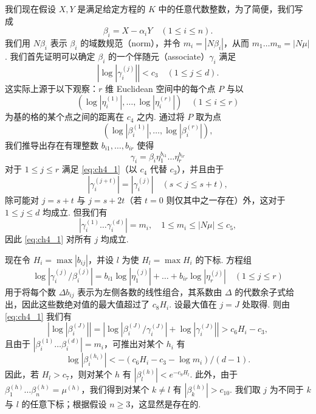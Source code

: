 我们现在假设 $X, Y$ 是满足给定方程的 $K$ 中的任意代数整数，为了简便，我们写成
\[
\beta_i = X - \alpha_i Y \quad (1 \le i \le n).
\]
我们用 $N\beta_i$ 表示 $\beta_i$ 的域数规范（norm），并令 $m_i = |N\beta_i|$，从而 $m_1\dots m_n = |N\mu|$. 我们首先证明可以确定 $\beta_i$ 的一个伴随元（associate）$\gamma_i$ 满足
\begin{equation} \label{eq:ch4_1}\tag{1}
\left|\log\left|\gamma_i^{(j)}\right|\right| < c_3 \quad (1 \le j \le d).
\end{equation}
这实际上源于以下观察：$r$ 维 Euclidean 空间中的每个点 $P$ 与以
\[
(\log |\eta_i^{(1)}|, \dots, \log |\eta_i^{(r)}|) \quad (1 \le i \le r)
\]
为基的格的某个点之间的距离在 $c_4$ 之内. 通过将 $P$ 取为点
\[
(\log |\beta_i^{(1)}|, \dots, \log |\beta_i^{(r)}|),
\]
我们推导出存在有理整数 $b_{i1}, \dots, b_{ir}$ 使得
\begin{equation} \label{eq:ch4_2}\tag{2}
\gamma_i = \beta_i \eta_1^{b_{i1}} \dots \eta_r^{b_{ir}}
\end{equation}
对于 $1 \le j \le r$ 满足 \eqref{eq:ch4_1}（以 $c_4$ 代替 $c_3$），并且由于
\[
\left|\gamma_i^{(j+t)}\right| = \left|\gamma_i^{(j)}\right| \quad (s < j \le s+t),
\]
除可能对 $j = s + t$ 与 $j = s + 2t$（若 $t = 0$ 则仅其中之一存在）外，这对于 $1 \le j \le d$ 均成立. 但我们有
\[
\left|\gamma_i^{(1)}\dots\gamma_i^{(d)}\right| = m_i, \quad 1 \le m_i \le \left|N\mu\right| \le c_5,
\]
因此 \eqref{eq:ch4_1} 对所有 $j$ 均成立.

现在令 $H_i = \max |b_{ij}|$，并设 $l$ 为使 $H_l = \max H_i$ 的下标. 方程组
\[
\log \left|\gamma_i^{(j)}/\beta_i^{(j)}\right| = b_{i1} \log \left|\eta_1^{(j)}\right| + \dots + b_{ir} \log \left|\eta_r^{(j)}\right| \quad (1 \le j \le r)
\]
用于将每个数 $\Delta b_{ij}$ 表示为左侧各数的线性组合，其系数由 $\Delta$ 的代数余子式给出，因此这些数绝对值的最大值超过了 $c_8H_i$. 设最大值在 $j=J$ 处取得. 则由 \eqref{eq:ch4_1} 我们有
\[
\left|\log\left|\beta_i^{(J)}\right|\right| = \left|\log\left|\beta_i^{(J)}/\gamma_i^{(J)}\right| + \log\left|\gamma_i^{(J)}\right|\right| > c_6H_i - c_3,
\]
且由于 $|\beta_i^{(1)} \dots \beta_i^{(d)}| = m_i$，可推出对某个 $h_i$ 有
\[
\log \left|\beta_i^{(h_i)}\right| < -(c_6 H_i - c_3 - \log m_i)/(d-1).
\]
因此，若 $H_l > c_7$，则对某个 $h$ 有 $|\beta_l^{(h)}| < e^{-c_9 H_l}$. 此外，由于 $\beta_1^{(h)} \dots \beta_n^{(h)} = \mu^{(h)}$，我们得到对某个 $k \neq l$ 有 $|\beta_k^{(h)}| > c_{10}$. 我们取 $j$ 为不同于 $k$ 与 $l$ 的任意下标；根据假设 $n \ge 3$，这显然是存在的.

